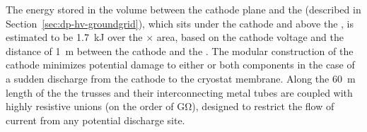 The energy stored in the volume between the cathode plane and the  (described in Section~\ref{sec:dp-hv-groundgrid}),
which sits under the cathode and above the , is estimated to be %
\SI{1.7}{\kilo\joule} 
over the \dptpcwdth $\times$ \dptpclen area, based on the cathode voltage and the distance of \SI{1}{\m} between the cathode and the . 
The modular construction of the cathode minimizes potential damage to either or both components in the case of a sudden discharge from the cathode to the cryostat membrane.
Along the \SI{60}{m} length of the  the trusses and their interconnecting metal tubes are %
coupled with highly resistive unions (on the order of \si{\giga\ohm}), %
designed to restrict the flow of current from %
any potential discharge site.    

